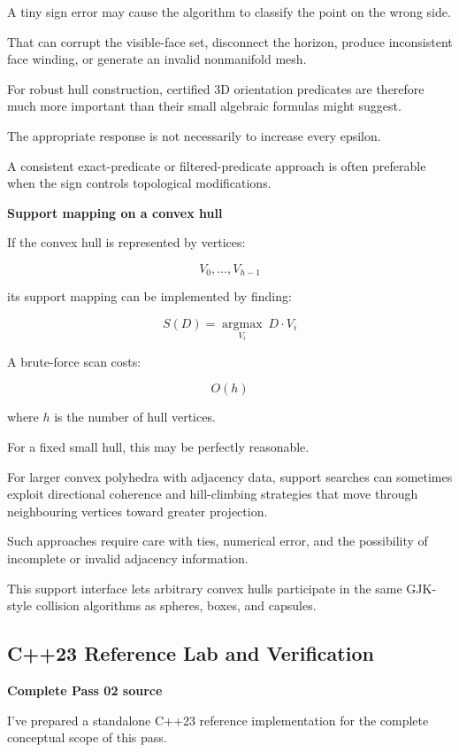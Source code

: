 A tiny sign error may cause the algorithm to classify the point on the wrong side.

That can corrupt the visible-face set, disconnect the horizon, produce inconsistent face winding, or generate an invalid nonmanifold mesh.

For robust hull construction, certified 3D orientation predicates are therefore much more important than their small algebraic formulas might suggest.

The appropriate response is not necessarily to increase every epsilon.

A consistent exact-predicate or filtered-predicate approach is often preferable when the sign controls topological modifications.

\textbf{Support mapping on a convex hull}

If the convex hull is represented by vertices:

\[
V_0,\ldots,V_{h-1}
\]

its support mapping can be implemented by finding:

\[
\boxed{ S(D)=\underset{V_i}{\operatorname{argmax}}\ D\cdot V_i }
\]

A brute-force scan costs:

\[
O(h)
\]

where \(h\) is the number of hull vertices.

For a fixed small hull, this may be perfectly reasonable.

For larger convex polyhedra with adjacency data, support searches can sometimes exploit directional coherence and hill-climbing strategies that move through neighbouring vertices toward greater projection.

Such approaches require care with ties, numerical error, and the possibility of incomplete or invalid adjacency information.

This support interface lets arbitrary convex hulls participate in the same GJK-style collision algorithms as spheres, boxes, and capsules.

\subsection{C++23 Reference Lab and Verification}\label{04-visual-computing-ii-ch022-c23-reference-lab-and-verification}

\textbf{Complete Pass 02 source}

I've prepared a standalone C++23 reference implementation for the complete conceptual scope of this pass.


